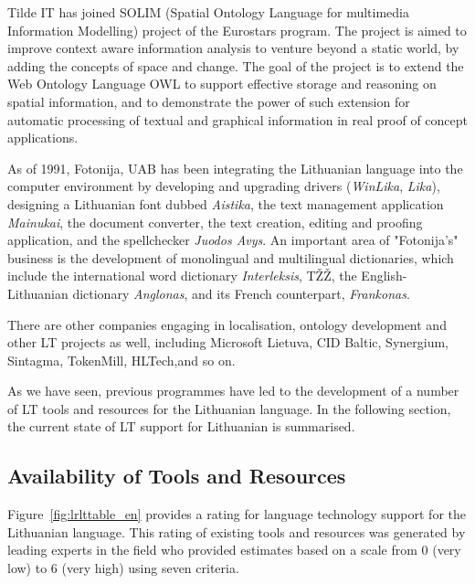 \documentclass[]{../metanetpaper}
\begin{document}
\begin{multicols}{2}
   Tilde IT has joined SOLIM (Spatial Ontology Language for multimedia Information Modelling) project of the Eurostars program. The project is aimed to improve context aware information analysis to venture beyond a static world, by adding the concepts of space and change. The goal of the project is to extend the Web Ontology Language OWL to support effective storage and reasoning on spatial information, and to demonstrate the power of such extension for automatic processing of textual and graphical information in real proof of concept applications. 

    As of 1991, Fotonija, UAB has been integrating the Lithuanian language into the computer environment by developing and upgrading drivers (\textit{WinLika}, \textit{Lika}), designing a Lithuanian font dubbed \textit{Aistika}, the text management application \textit{Mainukai}, the document converter, the text creation, editing and proofing application, and the spellchecker \textit{Juodos Avys}. An important area of "Fotonija’s" business is the development of monolingual and multilingual dictionaries, which include the international word dictionary \textit{Interleksis}, TŽŽ, the English-Lithuanian dictionary \textit{Anglonas}, and its French counterpart, \textit{Frankonas}.  

There are other companies engaging in localisation, ontology development and other LT projects as well, including Microsoft Lietuva, CID Baltic, Synergium, Sintagma, TokenMill, HLTech,and so on. 

    As we have seen, previous programmes have led to the development of a number of LT tools and resources for the Lithuanian language. In the following section, the current state of LT support for Lithuanian is summarised.
  
\subsection{Availability of Tools and Resources}

Figure~\ref{fig:lrlttable_en} provides a rating for language technology support for the Lithuanian language. This rating of existing tools and resources was generated by leading experts in the field who provided estimates based on a scale from 0 (very low) to 6 (very high) using seven criteria.


\end{multicols}
\end{document}
